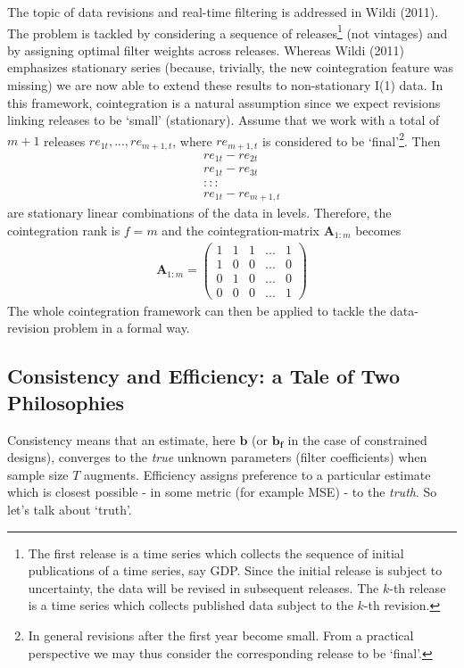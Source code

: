 \documentclass[11pt]{article}
\begin{document}
The topic of data revisions and real-time filtering is addressed in Wildi (2011). The problem is tackled by considering a sequence of releases\footnote{The first release is a time series which collects the sequence of initial publications of a time series, say GDP. Since the initial release is subject to uncertainty, the data will be revised in subsequent releases. The $k$-th release is a time series which collects published data subject to the $k$-th revision.} (not vintages) and by assigning optimal filter weights across releases. Whereas Wildi (2011) emphasizes stationary series (because, trivially, the new cointegration feature was  missing) we are now able to extend these results to non-stationary I(1) data. In this framework, cointegration is a natural assumption since we expect revisions linking releases to be `small' (stationary). Assume that we work with a total of $m+1$ releases $re_{1t},...,re_{m+1,t}$, where $re_{m+1,t}$ is considered to be `final'\footnote{In general revisions after the first year become small. From a practical perspective we may thus consider the corresponding release to be `final'.}. Then 
\begin{eqnarray*}
&&re_{1t}-re_{2t}\\
&&re_{1t}-re_{3t}\\
&&:::\\
&&re_{1t}-re_{m+1,t}
\end{eqnarray*}
are stationary linear combinations of the data in levels. Therefore,  the cointegration rank is $f=m$ and the cointegration-matrix $\mathbf{A}_{1:m}$ becomes
\begin{eqnarray*}
\mathbf{A}_{1:m}=\left(\begin{array}{ccccc} 1&1&1&...&1\\1&0&0&...&0\\0&1&0&...&0\\0&0&0&...&1\end{array}\right)
\end{eqnarray*}
The whole cointegration framework can then be applied to tackle the data-revision problem in a formal way.



\subsection{Consistency and Efficiency: a Tale of Two Philosophies}

Consistency  means that an estimate, here $\mathbf{b}$ (or $\mathbf{b_f}$ in the case of constrained designs), converges to the \emph{true} unknown parameters (filter coefficients) when sample size $T$ augments. Efficiency assigns preference to a particular estimate which is closest possible - in some metric (for example MSE) - to the \emph{truth}. So let's talk about `truth'.
\end{document}
